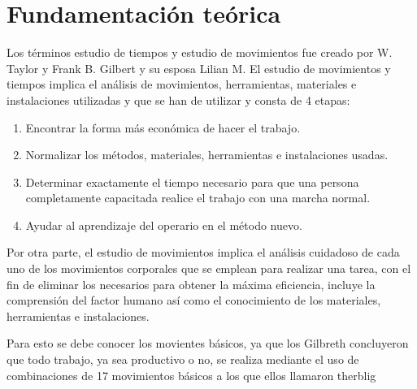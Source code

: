    \section{Fundamentación teórica}
    
    Los términos estudio de tiempos y estudio de movimientos fue creado por W. Taylor y Frank B. Gilbert y su esposa Lilian M. El estudio de movimientos y tiempos implica el análisis de movimientos, herramientas, materiales e instalaciones utilizadas y que se han de utilizar y consta de 4 etapas:
    \begin{enumerate}
        \item Encontrar la forma más económica de hacer el trabajo.
        \item Normalizar los métodos, materiales, herramientas e instalaciones usadas.
        \item Determinar exactamente el tiempo necesario para que una persona completamente capacitada realice el trabajo con una marcha normal.
    \item Ayudar al aprendizaje del operario en el método nuevo.
    \end{enumerate}
    
    Por otra parte, el estudio de movimientos implica el análisis cuidadoso de cada uno de los movimientos corporales que se emplean para realizar una tarea, con el fin de eliminar los necesarios para obtener la máxima eficiencia, incluye la comprensión del factor humano así como el conocimiento de los materiales, herramientas e instalaciones. 
    \cite{niebel1980ingenieria}
    
    
    Para esto se debe conocer los movientes básicos, ya que los Gilbreth concluyeron que todo trabajo, ya sea productivo o no, se realiza mediante el uso de combinaciones de 17 movimientos básicos a los que ellos llamaron therblig \cite{niebel1980ingenieria}  
    
